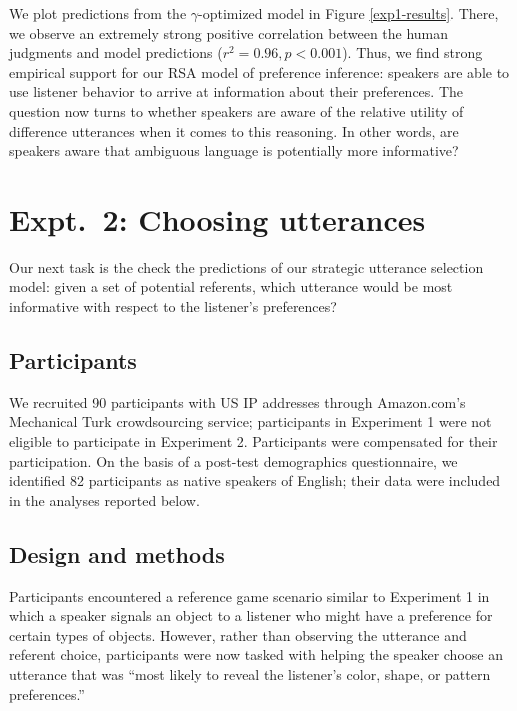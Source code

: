 \documentclass[10pt,a4paper]{article}
\begin{document}
We plot predictions from the $\gamma$-optimized model in Figure \ref{exp1-results}. There, we observe an extremely strong positive correlation between the human judgments and model predictions ($r^2 = 0.96, p < 0.001$). Thus, we find strong empirical support for our RSA model of preference inference: speakers are able to use listener behavior to arrive at information about their preferences. The question now turns to whether speakers are aware of the relative utility of difference utterances when it comes to this reasoning. In other words, are speakers aware that ambiguous language is potentially more informative?




\section{Expt.~2: Choosing utterances}

Our next task is the check the predictions of our strategic utterance selection model: given a set of potential referents, which utterance would be most informative with respect to the listener's preferences?

\subsection{Participants}

We recruited 90 participants with US IP addresses through Amazon.com's Mechanical Turk crowdsourcing service; participants in Experiment 1 were not eligible to participate in Experiment 2. Participants were compensated for their participation. On the basis of a post-test demographics questionnaire, we identified 82 participants as native speakers of English; their data were included in the analyses reported below.

\subsection{Design and methods}

Participants encountered a reference game scenario similar to Experiment 1 in which a speaker signals an object to a listener who might have a preference for certain types of objects. However, rather than observing the utterance and referent choice, participants were now tasked with helping the speaker choose an utterance that was ``most likely to reveal the listener's color, shape, or pattern preferences.''
\end{document}

